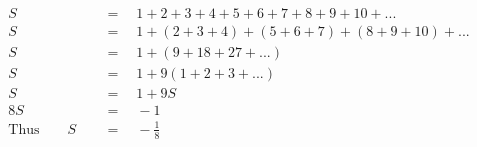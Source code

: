 \begin{align*}
S\quad&\,=\quad1+2+3+4+5+6+7+8+9+10+...\\
S\quad&\,=\quad1+(2+3+4)+(5+6+7)+(8+9+10)+...\\
S\quad&\,=\quad1+(9+18+27+...)\\
S\quad&\,=\quad1+9(1+2+3+...)\\
S\quad&\,=\quad1+9S\\
8S\quad&\,=\quad-1\\
\mathrm{Thus}\qquad S\quad&\,=\quad-\frac{1}{8}
\end{align*}
